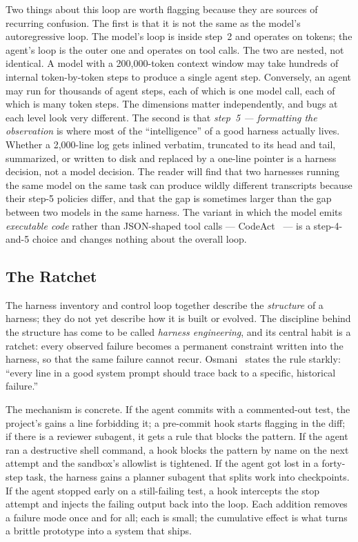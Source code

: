 \noindent
Two things about this loop are worth flagging because they are
sources of recurring confusion. The first is that it is not the
same as the model's autoregressive loop. The model's loop is
inside step~2 and operates on tokens; the agent's loop is the
outer one and operates on tool calls. The two are nested, not
identical. A model with a 200,000-token context window may take
hundreds of internal token-by-token steps to produce a single
agent step. Conversely, an agent may run for thousands of agent
steps, each of which is one model call, each of which is many
token steps. The dimensions matter independently, and bugs at
each level look very different. The second is that
\emph{step~5 --- formatting the observation} is where most of the
``intelligence'' of a good harness actually lives. Whether a
2,000-line log gets inlined verbatim, truncated to its head and
tail, summarized, or written to disk and replaced by a one-line
pointer is a harness decision, not a model decision. The reader
will find that two harnesses running the same model on the same
task can produce wildly different transcripts because their
step-5 policies differ, and that the gap is sometimes larger
than the gap between two models in the same harness. The variant
in which the model emits \emph{executable code} rather than
JSON-shaped tool calls --- CodeAct~\citep{wang2024codeact} ---
is a step-4-and-5 choice and changes nothing about the overall
loop.

\subsection{The Ratchet}
\label{sec:agents-harness-ratchet}

The harness inventory and control loop together describe the
\emph{structure} of a harness; they do not yet describe how it is
built or evolved. The discipline behind the structure has come to
be called \emph{harness engineering}, and its central habit is a
ratchet: every observed failure becomes a permanent constraint
written into the harness, so that the same failure cannot recur.
Osmani~\citep{osmani2026harness} states the rule starkly: ``every
line in a good system prompt should trace back to a specific,
historical failure.''

The mechanism is concrete. If the agent commits with a
commented-out test, the project's  gains a line
forbidding it; a pre-commit hook starts flagging  in
the diff; if there is a reviewer subagent, it gets a rule that
blocks the pattern. If the agent ran a destructive shell command,
a hook blocks the pattern by name on the next attempt and the
sandbox's allowlist is tightened. If the agent got lost in a
forty-step task, the harness gains a planner subagent that splits
work into checkpoints. If the agent stopped early on a still-failing
test, a hook intercepts the stop attempt and injects the failing
output back into the loop. Each addition removes a failure mode
once and for all; each is small; the cumulative effect is what
turns a brittle prototype into a system that ships.

